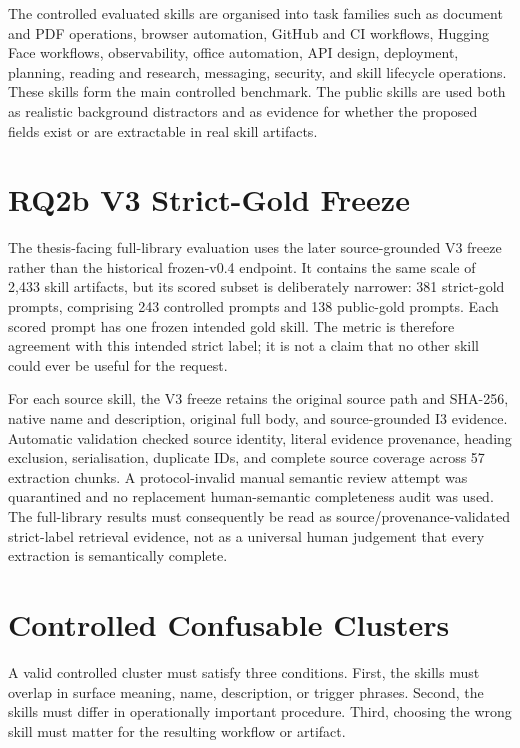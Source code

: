 The controlled evaluated skills are organised into task families such as document and PDF operations, browser automation, GitHub and CI workflows, Hugging Face workflows, observability, office automation, API design, deployment, planning, reading and research, messaging, security, and skill lifecycle operations. These skills form the main controlled benchmark. The public skills are used both as realistic background distractors and as evidence for whether the proposed fields exist or are extractable in real skill artifacts.

\section{RQ2b V3 Strict-Gold Freeze}

The thesis-facing full-library evaluation uses the later source-grounded V3 freeze rather than the historical frozen-v0.4 endpoint. It contains the same scale of 2,433 skill artifacts, but its scored subset is deliberately narrower: 381 strict-gold prompts, comprising 243 controlled prompts and 138 public-gold prompts. Each scored prompt has one frozen intended gold skill. The metric is therefore agreement with this intended strict label; it is not a claim that no other skill could ever be useful for the request.

For each source skill, the V3 freeze retains the original source path and SHA-256, native name and description, original full body, and source-grounded I3 evidence. Automatic validation checked source identity, literal evidence provenance, heading exclusion, serialisation, duplicate IDs, and complete source coverage across 57 extraction chunks. A protocol-invalid manual semantic review attempt was quarantined and no replacement human-semantic completeness audit was used. The full-library results must consequently be read as source/provenance-validated strict-label retrieval evidence, not as a universal human judgement that every extraction is semantically complete.

\section{Controlled Confusable Clusters}

A valid controlled cluster must satisfy three conditions. First, the skills must overlap in surface meaning, name, description, or trigger phrases. Second, the skills must differ in operationally important procedure. Third, choosing the wrong skill must matter for the resulting workflow or artifact.

